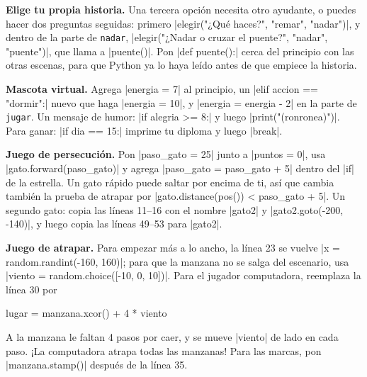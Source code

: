 \textbf{Elige tu propia historia.} Una tercera opción necesita otro ayudante, o puedes hacer dos preguntas seguidas: primero \py|elegir("¿Qué haces?", "remar", "nadar")|, y dentro de la parte de \texttt{nadar}, \py|elegir("¿Nadar o cruzar el puente?", "nadar", "puente")|, que llama a \py|puente()|. Pon \py|def puente():| cerca del principio con las otras escenas, para que Python ya lo haya leído antes de que empiece la historia.

\textbf{Mascota virtual.} Agrega \py|energia = 7| al principio, un \py|elif accion == "dormir":| nuevo que haga \py|energia = 10|, y \py|energia = energia - 2| en la parte de \texttt{jugar}. Un mensaje de humor: \py|if alegria >= 8:| y luego \py|print("(ronronea)")|. Para ganar: \py|if dia == 15:| imprime tu diploma y luego \py|break|.

\textbf{Juego de persecución.} Pon \py|paso_gato = 25| junto a \py|puntos = 0|, usa \py|gato.forward(paso_gato)| y agrega \py|paso_gato = paso_gato + 5| dentro del \py|if| de la estrella. Un gato rápido puede saltar por encima de ti, así que cambia también la prueba de atrapar por \py|gato.distance(pos()) < paso_gato + 5|. Un segundo gato: copia las líneas 11--16 con el nombre \py|gato2| y \py|gato2.goto(-200, -140)|, y luego copia las líneas 49--53 para \py|gato2|.

\textbf{Juego de atrapar.} Para empezar más a lo ancho, la línea 23 se vuelve \py|x = random.randint(-160, 160)|; para que la manzana no se salga del escenario, usa \py|viento = random.choice([-10, 0, 10])|. Para el jugador computadora, reemplaza la línea 30 por
\begin{codenonum}
    lugar = manzana.xcor() + 4 * viento
\end{codenonum}
A la manzana le faltan 4 pasos por caer, y se mueve \py|viento| de lado en cada paso. ¡La computadora atrapa todas las manzanas! Para las marcas, pon \py|manzana.stamp()| después de la línea 35.
